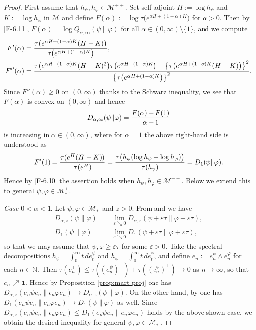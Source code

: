 \documentclass[12pt]{article}
\theoremstyle{definition}
\theoremstyle{remark}
\numberwithin{equation}{section}
\def\Me{\mathcal M}
\def\ffi{\varphi}
\def\1{\mathbf{1}}
\def\eps{\varepsilon}
\def\bN{\mathbb{N}}
\begin{document}
\begin{proof}
First assume that $h_\psi,h_\ffi\in\Me^{++}$. Set self-adjoint $H:=\log h_\psi$ and $K:=\log h_\ffi$ in $\Me$
and define $F(\alpha):=\log\tau\bigl(e^{\alpha H+(1-\alpha)K}\bigr)$ for $\alpha>0$.
Then by \eqref{F-6.11}, $F(\alpha)=\log Q_{\alpha,\infty}(\psi\|\ffi)$ for all $\alpha\in(0,\infty)\setminus\{1\}$,
and we compute
\begin{align*}
F'(\alpha)&={\tau\bigl(e^{\alpha H+(1-\alpha)K}(H-K)\bigr)\over\tau\bigl(e^{\alpha H+(1-\alpha)K}\bigr)}, \\
F''(\alpha)&={\tau\bigl(e^{\alpha H+(1-\alpha)K}(H-K)^2\bigr)\tau\bigl(e^{\alpha
H+(1-\alpha)K}\bigr)-\bigl\{\tau\bigl(e^{\alpha H+(1-\alpha)K}(H-K)\bigr)\bigr\}^2
\over\bigl\{\tau\bigl(e^{\alpha H+(1-\alpha)K}\bigr)\bigr\}^2}.
\end{align*}
Since $F''(\alpha)\ge0$ on $(0,\infty)$ thanks to the Schwarz inequality, we see that $F(\alpha)$ is
convex on $(0,\infty)$ and hence
\[
D_{\alpha,\infty}(\psi\|\ffi)={F(\alpha)-F(1)\over\alpha-1}
\]
is increasing in $\alpha\in(0,\infty)$, where for $\alpha=1$ the above right-hand side is understood as
\[
F'(1)={\tau(e^H(H-K))\over\tau(e^H)}={\tau\bigl(h_\psi(\log h_\psi-\log h_\ffi)\bigr)\over\tau(h_\psi)}
=D_1(\psi\|\ffi).
\]
Hence by \eqref{F-6.10} the assertion holds when $h_\psi,h_\ffi\in\Me^{++}$. Below we extend this to
general $\psi,\ffi\in\Me_*^+$.

{\it Case $0<\alpha<1$}.\enspace
Let $\psi,\ffi\in\Me_*^+$ and $z>0$. From \cite[Theorem 1(iv)]{kato2023onrenyi} and
\cite[Corollary 2.8(3)]{hiai2021quantum} we have
\begin{align*}
D_{\alpha,z}(\psi\|\ffi)&=\lim_{\eps\searrow0}D_{\alpha,z}(\psi+\eps\tau\|\ffi+\eps\tau), \\
D_1(\psi\|\ffi)&=\lim_{\eps\searrow0}D_1(\psi+\eps\tau\|\ffi+\eps\tau),
\end{align*}
so that we may assume that $\psi,\ffi\ge\eps\tau$ for some $\eps>0$. Take the spectral decompositions
$h_\psi=\int_0^\infty t\,de_t^\psi$ and $h_\ffi=\int_0^\infty t\,de_t^\ffi$, and define
$e_n:=e_n^\psi\wedge e_n^\ffi$ for each $n\in\bN$. Then
$\tau(e_n^\perp)\le\tau((e_n^\psi)^\perp)+\tau((e_n^\ffi)^\perp)\to0$ as $n\to\infty$,
so that $e_n\nearrow\1$. Hence by Proposition \ref{prop:mart-proj} one has
$D_{\alpha,z}(e_n\psi e_n\|e_n\ffi e_n)\to D_{\alpha,z}(\psi\|\ffi)$. On the other hand,
by \cite[Proposition 2.10]{hiai2021quantum} one has
$D_1(e_n\psi e_n\|e_n\ffi e_n)\to D_1(\psi\|\ffi)$ as well. Since
$D_{\alpha,z}(e_n\psi e_n\|e_n\ffi e_n)\le D_1(e_n\psi e_n\|e_n\ffi e_n)$
holds by the above shown case, we obtain the desired inequality for general $\psi,\ffi\in\Me_*^+$.


\end{proof}
\end{document}
